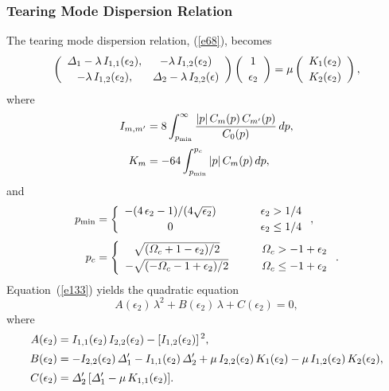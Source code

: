 \documentclass[12pt,prb,aps]{revtex4-1}
\begin{document}
\subsubsection{Tearing Mode Dispersion Relation}
The tearing mode dispersion relation, (\ref{e68}), becomes
\begin{equation}\label{e133}
\left(\begin{array}{cc}
{\mit\Delta}_1-\lambda\,I_{1,1}(\epsilon_2),&-\lambda\, I_{1,2}(\epsilon_2)\\[0.5ex]
-\lambda\,I_{1,2}(\epsilon_2),&{\mit\Delta}_2-\lambda\, I_{2,2}(\epsilon)\end{array}\right)\left(\begin{array}{c}1\\[0.5ex]\epsilon_2\end{array}
\right) = \mu\left(\begin{array}{c}K_1(\epsilon_2)\\[0.5ex]K_2(\epsilon_2)\end{array}
\right),
\end{equation}
where 
\begin{align}
I_{m,m'} &= 8\int_{p_{\rm min}}^\infty\frac{|p|\,C_m(p)\,C_{m'}(p)}{C_0(p)}\,dp,\\[0.5ex]
K_m &= -64 \int_{p_{\rm min}}^{p_c} |p|\,C_m(p)\,dp,
\end{align}
and 
\begin{align}
p_{\rm min} &=\left\{
\begin{array}{ccc} - (4\,\epsilon_2-1)/(4\sqrt{\epsilon_2})&~~~~~~& \epsilon_2> 1/4\\[0.5ex]
0&&\epsilon_2\leq 1/4\end{array}
\right.,\\[0.5ex]
p_c &=\left\{
\begin{array}{ccc} \sqrt{({\mit\Omega}_c+1-\epsilon_2)/2}&~~~& {\mit\Omega}_c> -1+\epsilon_2\\[0.5ex]
-\sqrt{(-{\mit\Omega}_c-1+\epsilon_2)/2}&&{\mit\Omega}_c\leq -1+\epsilon_2\end{array}
\right..
\end{align}
Equation~(\ref{e133}) yields the quadratic equation
\begin{equation}\label{e133a}
A(\epsilon_2)\,\lambda^2 + B(\epsilon_2)\,\lambda + C(\epsilon_2) = 0, 
\end{equation}
where
\begin{align}
A(\epsilon_2)& = I_{1,1}(\epsilon_2)\,I_{2,2}(\epsilon_2)-[I_{1,2}(\epsilon_2)]^{\,2},\\[0.5ex]
B(\epsilon_2)&=- I_{2,2}(\epsilon_2)\,{\mit\Delta}_1' - I_{1,1}(\epsilon_2)\,{\mit\Delta}_2' + \mu\,I_{2,2}(\epsilon_2)\,K_1(\epsilon_2) - \mu\,I_{1,2}(\epsilon_2)\,K_2(\epsilon_2),\\[0.5ex]
C(\epsilon_2)&= {\mit\Delta}_2'\,[{\mit\Delta}_1'-\mu\,K_{1,1}(\epsilon_2)].
\end{align}
\end{document}
